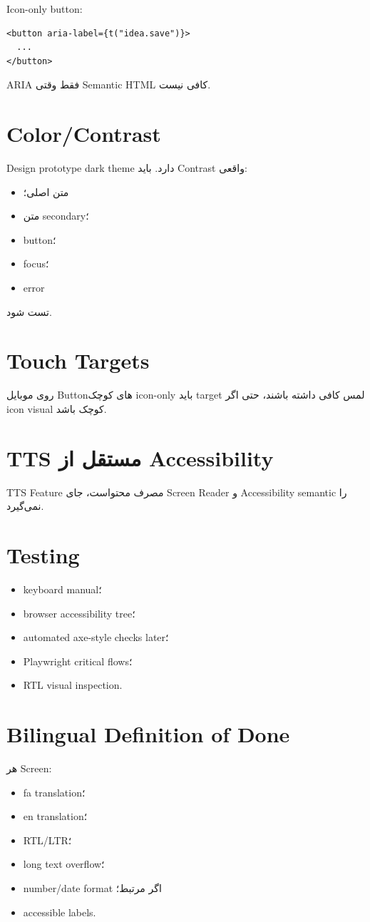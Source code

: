 Icon-only button:
\begin{latin}
\begin{lstlisting}
<button aria-label={t("idea.save")}>
  ...
</button>
\end{lstlisting}
\end{latin}

ARIA فقط وقتی Semantic HTML کافی نیست.

\section{Color/Contrast}

Design prototype dark theme دارد. باید Contrast واقعی:
\begin{itemize}
  \item متن اصلی؛
  \item متن secondary؛
  \item button؛
  \item focus؛
  \item error
\end{itemize}
تست شود.

\section{Touch Targets}

روی موبایل Buttonهای کوچک icon-only باید target لمس کافی داشته باشند، حتی اگر icon visual کوچک باشد.

\section{TTS مستقل از Accessibility}

TTS Feature مصرف محتواست، جای Screen Reader و Accessibility semantic را نمی‌گیرد.

\section{Testing}

\begin{itemize}
  \item keyboard manual؛
  \item browser accessibility tree؛
  \item automated axe-style checks later؛
  \item Playwright critical flows؛
  \item RTL visual inspection.
\end{itemize}

\section{Bilingual Definition of Done}

هر Screen:
\begin{itemize}
  \item fa translation؛
  \item en translation؛
  \item RTL/LTR؛
  \item long text overflow؛
  \item number/date format اگر مرتبط؛
  \item accessible labels.
\end{itemize}
